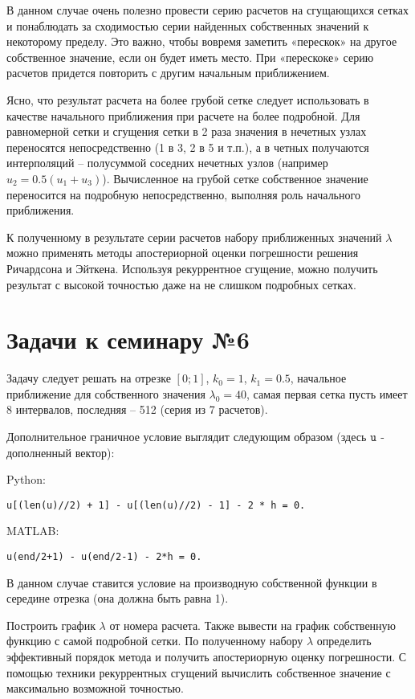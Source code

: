 \documentclass{article}
\begin{document}
В данном случае очень полезно провести серию расчетов на сгущающихся сетках и понаблюдать за сходимостью серии найденных собственных значений к некоторому пределу. Это важно, чтобы вовремя заметить «перескок» на другое собственное значение, если он будет иметь место. При «перескоке» серию расчетов придется повторить с другим начальным приближением.

Ясно, что результат расчета на более грубой сетке следует использовать в качестве начального приближения при расчете на более подробной. Для равномерной сетки и сгущения сетки в 2 раза значения в нечетных узлах переносятся непосредственно (1 в 3, 2 в 5 и т.п.), а в четных получаются интерполяций – полусуммой соседних нечетных узлов (например $u_2 = 0.5(u_1+u_3)$). Вычисленное на грубой сетке собственное значение переносится на подробную непосредственно, выполняя роль начального приближения.

К полученному в результате серии расчетов набору приближенных значений $\lambda$ можно применять методы апостериорной оценки погрешности решения Ричардсона и Эйткена. Используя рекуррентное сгущение, можно получить результат с высокой точностью даже на не слишком подробных сетках. 

\section*{Задачи к семинару №6}
Задачу следует решать на отрезке $[0; 1]$, $k_0 = 1$, $k_1 = 0.5$, начальное приближение для собственного значения $\lambda_0 = 40$, самая первая сетка пусть имеет 8 интервалов, последняя – 512  (серия из 7 расчетов). 

Дополнительное граничное условие выглядит следующим образом (здесь $\texttt{\lstinline|u|}$ - дополненный вектор):

Python:
\begin{verbatim}
u[(len(u)//2) + 1] - u[(len(u)//2) - 1] - 2 * h = 0.
\end{verbatim}
MATLAB:
\begin{matlablisting}
	\begin{verbatim}
u(end/2+1) - u(end/2-1) - 2*h = 0.
	\end{verbatim}
\end{matlablisting}
В данном случае ставится условие на производную собственной функции в середине отрезка (она должна быть равна 1).

Построить график $\lambda$ от номера расчета. Также вывести на график собственную функцию с самой подробной сетки. По полученному набору $\lambda$ определить эффективный порядок метода и получить апостериорную оценку погрешности. С помощью техники рекуррентных сгущений вычислить собственное значение с максимально возможной точностью.
\end{document}
